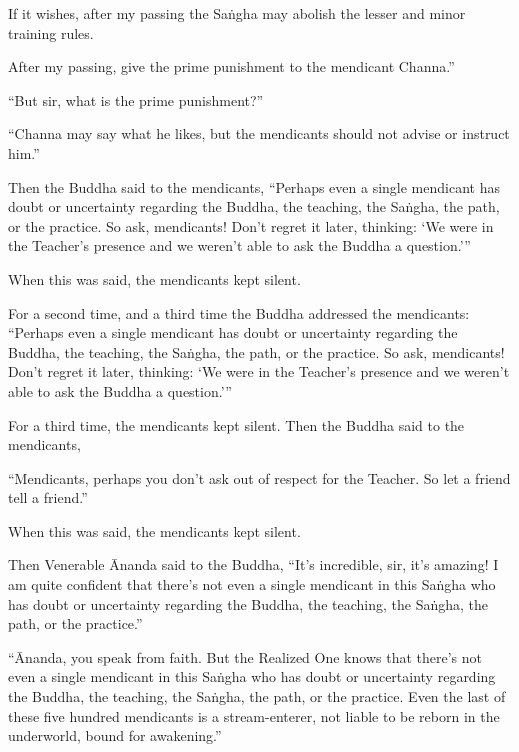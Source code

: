 \documentclass[12pt,openany]{book}%
\begin{document}
If it wishes, after my passing the \textsanskrit{Saṅgha} may abolish the lesser and minor training rules. 

After my passing, give the prime punishment to the mendicant Channa.” 

“But sir, what is the prime punishment?” 

“Channa may say what he likes, but the mendicants should not advise or instruct him.” 

Then the Buddha said to the mendicants, “Perhaps even a single mendicant has doubt or uncertainty regarding the Buddha, the teaching, the \textsanskrit{Saṅgha}, the path, or the practice. So ask, mendicants! Don’t regret it later, thinking: ‘We were in the Teacher’s presence and we weren’t able to ask the Buddha a question.’” 

When this was said, the mendicants kept silent. 

For a second time, and a third time the Buddha addressed the mendicants: “Perhaps even a single mendicant has doubt or uncertainty regarding the Buddha, the teaching, the \textsanskrit{Saṅgha}, the path, or the practice. So ask, mendicants! Don’t regret it later, thinking: ‘We were in the Teacher’s presence and we weren’t able to ask the Buddha a question.’” 

For a third time, the mendicants kept silent. Then the Buddha said to the mendicants, 

“Mendicants, perhaps you don’t ask out of respect for the Teacher. So let a friend tell a friend.” 

When this was said, the mendicants kept silent. 

Then Venerable Ānanda said to the Buddha, “It’s incredible, sir, it’s amazing! I am quite confident that there’s not even a single mendicant in this \textsanskrit{Saṅgha} who has doubt or uncertainty regarding the Buddha, the teaching, the \textsanskrit{Saṅgha}, the path, or the practice.” 

“Ānanda, you speak from faith. But the Realized One knows that there’s not even a single mendicant in this \textsanskrit{Saṅgha} who has doubt or uncertainty regarding the Buddha, the teaching, the \textsanskrit{Saṅgha}, the path, or the practice. Even the last of these five hundred mendicants is a stream-enterer, not liable to be reborn in the underworld, bound for awakening.” 
\end{document}
